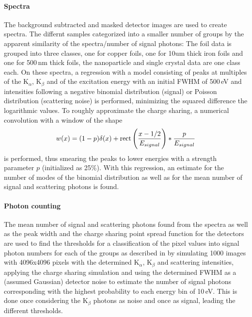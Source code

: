 \paragraph{Spectra}
The background subtracted and masked detector images are used to create spectra. The differnt samples categorized into a smaller number of groups by the apparent similarity of the spectra/number of signal photons: The foil  data is grouped into three classes, one for copper foils, one for 10um thick iron foils and one for 500\,nm thick foils, the nanoparticle and single crystal data are one class each.
On these spectra, a regression with a model consisting of peaks at multiples of the K$_\alpha$, K$_\beta$ and of the excitation energy with an initial FWHM of 500\,eV and intensities following a negative binomial distribution (signal) or Poisson distribution (scattering noise) is performed, minimizing the squared difference the logarithmic values. To roughly approximate the charge sharing, a numerical convolution with a  window of the shape
\begin{equation}
	w (x)= (1-p)\delta(x)+\operatorname{rect}\left(\frac{x-1/2}{E_{signal}}\right)*\frac{p}{E_{signal}}
\end{equation}
is performed, thus smearing the peaks to lower energies with a strength parameter $p$ (initialized as 25\%).
With this regression, an estimate for the number of modes of the binomial distribution as well as for the mean number of signal and scattering photons is found.




\paragraph{Photon counting}

The mean number of signal and scattering photons found from the spectra as well as the peak width and the charge sharing point spread function for the detectors are used to find the thresholds for a classification of the pixel values into signal photon numbers for each of the groups as described in  by simulating 1000 images with 4096x4096 pixels with the determined K$_\alpha$, K$_\beta$ and scattering intensities, applying the charge sharing simulation and using the determined FWHM as a (assumed Gaussian) detector noise to estimate the number of signal photons corresponding with the highest probability to each energy bin of 10\,eV. This is done once  considering the K$_\beta$ photons as noise and once as signal, leading the different thresholds.










